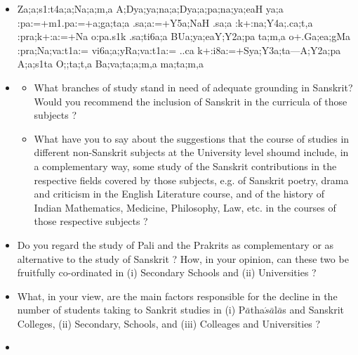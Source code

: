 \begin{spacing}{1.15}
\begin{itemize}
\begin{itemize}
    \item[({\sktf ga})] {\sktf Za;a;s1:t4a;a;Na;a;m,a
A;Dya;ya;na;a;Dya;a;pa;na;ya;eaH ya;a :pa:=+m1.pa:=+a;ga;ta;a
.sa;a:=+Y5a;NaH\ZF{,} .sa;a :k+:na;Y4a;.ca;t,a
:pra;k+:a:=+Na {o}{:pa}.s1k .sa;ti6a;a BUa;ya;eaY;Y2a;pa ta;m,a
o+.Ga;ea;gMa :pra;Na;va:t1a:= vi6a;a;yRa;va:t1a:= ..ca
k+:i8a:=+Sya;Y3a;ta}{\rm ---}{\sktf A;Y2a;pa A;a;s1ta
O;;ta;t,a Ba;va;ta;a;m,a ma;ta;m,a }
 \end{itemize}
 \end{itemize}
\end{spacing}

{\rm 
\begin{itemize}
\item[14] \begin{itemize}
                 \item[(a)] What branches of study stand in need of adequate grounding in Sanskrit? Would you recommend the inclusion of Sanskrit in the curricula of those subjects ?
                 
                 \item[(b)] What have you to say about the suggestions that the course of studies in different non-Sanskrit subjects at the University level shoumd include, in a complementary way, some study of the Sanskrit contributions in the respective fields covered by those subjects, e.g. of Sanskrit poetry, drama and criticism in the English Literature course, and of the history of Indian Mathematics, Medicine, Philosophy, Law, etc. in the courses of those respective subjects ?
              \end{itemize}        
              
    \item[15] Do you regard the study of Pali and the Prakrits as complementary or as alternative to the study of Sanskrit ? How, in your opinion, can these two be fruitfully co-ordinated in (i) Secondary Schools and (ii) Universities ?          
     
     \item[16] What, in your view, are the main factors responsible for the decline in the number of students taking to Sankrit studies in (i) P$\bar{a}$tha$\acute{s}\bar{a}$l$\bar{a}$s and Sanskrit Colleges, (ii) Secondary, Schools, and (iii) Colleages and Universities ?         
      
      \item[17] \begin{itemize}
                 

\end{itemize}
\end{itemize}}
